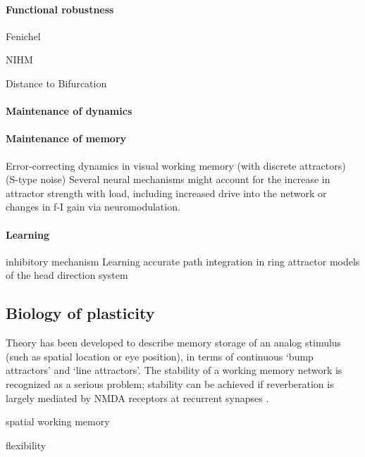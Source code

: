 \documentclass{article}
\theoremstyle{definition} \newtheorem{definition}{Definition}
\theoremstyle{remark} \newtheorem{remark}{Remark}
\newcounter{ct}
\begin{document}
\paragraph{Functional robustness}

Fenichel

NIHM

\citep{li2013normally}

Distance to Bifurcation \citep{dobson2003sensitivity}


\paragraph{Maintenance of dynamics}


\paragraph{Maintenance of memory}
Error-correcting dynamics in visual working memory (with discrete attractors) \citep{panichello2019error} (S-type noise)
Several neural mechanisms might account for the increase in attractor strength with load, including increased drive into the network\citep{wang2018flexible} or changes in f-I gain via neuromodulation\citep{servan1990network}.

\citep{fauth2019self}



\paragraph{Learning}
inhibitory mechanism \citep{couey2013recurrent}
Learning accurate path integration in ring attractor models of the head direction system \citep{vafidis2022hd}

\subsection{Biology of plasticity}

Theory has been developed to describe memory storage of an analog stimulus (such as spatial location or eye position), in terms of continuous ‘bump attractors' and ‘line attractors'.
The stability of a working memory network is recognized as a serious problem; stability can be achieved if reverberation is largely mediated by NMDA receptors at recurrent synapses \citep{wang2001synaptic}.

spatial working memory\citep{compte2000synaptic}

flexibility \citep{remington2018flexible}
\end{document}
